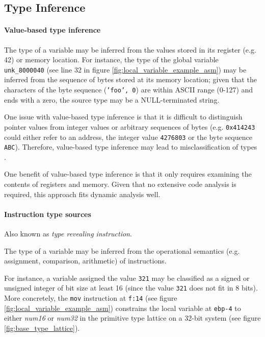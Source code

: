 
\subsection{Type Inference}


\paragraph{Value-based type inference}

The type of a variable may be inferred from the values stored in its register (e.g. 42) or memory location. For instance, the type of the global variable \texttt{unk\_8000040} (see line 32 in figure \ref{fig:local_variable_example_asm}) may be inferred from the sequence of bytes stored at its memory location; given that the characters of the byte sequence (\texttt{'foo', 0}) are within ASCII range (0-127) and ends with a zero, the source type may be a NULL-terminated string.

One issue with value-based type inference is that it is difficult to distinguish pointer values from integer values or arbitrary sequences of bytes (e.g. \texttt{0x414243} could either refer to an address, the integer value \texttt{4276803} or the byte sequence \texttt{ABC}). Therefore, value-based type inference may lead to misclassification of types \cite{type_inference_on_executables}.

One benefit of value-based type inference is that it only requires examining the contents of registers and memory. Given that no extensive code analysis is required, this approach fits dynamic analysis well.


\paragraph{Instruction type sources}

Also known as \textit{type revealing instruction}.

The type of a variable may be inferred from the operational semantics (e.g. assignment, comparison, arithmetic) of instructions.

For instance, a variable assigned the value \texttt{321} may be classified as a signed or unsigned integer of bit size at least 16 (since the value \texttt{321} does not fit in 8 bits). More concretely, the \texttt{mov} instruction at \texttt{f:14} (see figure \ref{fig:local_variable_example_asm}) constrains the local variable at \texttt{ebp-4} to either \textit{num16} or \textit{num32} in the primitive type lattice on a 32-bit system (see figure \ref{fig:base_type_lattice}).

